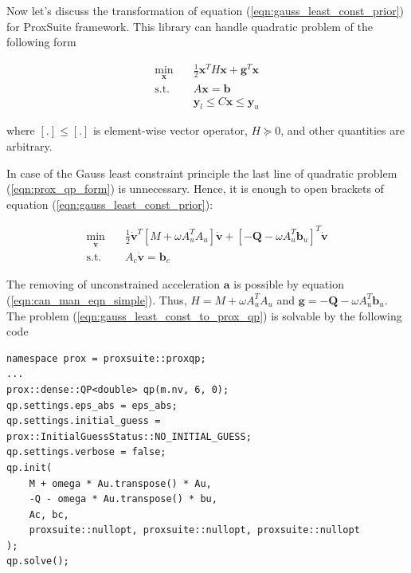 Now let's discuss the transformation of equation 
(\ref{eqn:gauss_least_const_prior}) for ProxSuite framework. This library can 
handle quadratic problem of the following form

\begin{equation}
    \begin{aligned}
        \min_{\mathbf{x}} \quad & 
        \frac{1}{2} \mathbf{x}^T H \mathbf{x} + 
        \mathbf{g}^T \mathbf{x} \\
        \textrm{s.t.} \quad & A \mathbf{x} = \mathbf{b} \\
        & \mathbf{y}_l \leq C \mathbf{x} \leq \mathbf{y}_u  
    \end{aligned}
    \label{eqn:prox_qp_form}
\end{equation}

where $[.] \leq [.]$ is element-wise vector operator, $H \succeq 0$, and 
other quantities are arbitrary.

In case of the Gauss least constraint principle the last line of quadratic 
problem (\ref{eqn:prox_qp_form}) is unnecessary. Hence, it is enough 
to open brackets of equation (\ref{eqn:gauss_least_const_prior}):

\begin{equation}
    \begin{aligned}
        \min_{\dot{\mathbf{v}}} \quad & 
        \frac{1}{2} \dot{\mathbf{v}}^T [M + \omega A_u^T A_u] \dot{\mathbf{v}} + 
        [-\mathbf{Q} - \omega A_u^T \mathbf{b}_u]^T \dot{\mathbf{v}} \\
        \textrm{s.t.} \quad & A_c \dot{\mathbf{v}} = \mathbf{b}_c
    \end{aligned}
    \label{eqn:gauss_least_const_to_prox_qp}
\end{equation}

The removing of unconstrained acceleration $\mathbf{a}$ is possible by equation 
(\ref{eqn:can_man_eqn_simple}). Thus, $H = M + \omega A_u^T A_u$ and 
$\mathbf{g} = -\mathbf{Q} - \omega A_u^T \mathbf{b}_u$. The problem 
(\ref{eqn:gauss_least_const_to_prox_qp}) is solvable by the following 
code

\begin{lstlisting}[caption={Quadratic problem solution}, label=snp:qp_sol]
namespace prox = proxsuite::proxqp;
...
prox::dense::QP<double> qp(m.nv, 6, 0);
qp.settings.eps_abs = eps_abs;
qp.settings.initial_guess = prox::InitialGuessStatus::NO_INITIAL_GUESS;
qp.settings.verbose = false;
qp.init(
    M + omega * Au.transpose() * Au,
    -Q - omega * Au.transpose() * bu,
    Ac, bc,
    proxsuite::nullopt, proxsuite::nullopt, proxsuite::nullopt
);
qp.solve();
\end{lstlisting}

